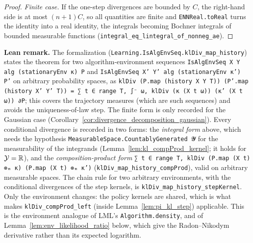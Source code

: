 \begin{proof}
\emph{Finite case.} If the one-step divergences are bounded by $C$, the right-hand side is at
most $(n+1)C$, so all quantities are finite and \texttt{ENNReal.toReal} turns the identity into
a real identity, the integrals becoming Bochner integrals of bounded measurable functions
(\texttt{integral\_eq\_lintegral\_of\_nonneg\_ae}).
\end{proof}

\textbf{Lean remark.} The formalization (\texttt{Learning.IsAlgEnvSeq.klDiv\_map\_history})
states the theorem for two algorithm-environment sequences \texttt{IsAlgEnvSeq X Y alg
(stationaryEnv κ) P} and \texttt{IsAlgEnvSeq X' Y' alg (stationaryEnv κ') P'} on arbitrary
probability spaces, as \texttt{klDiv (P.map (history X Y T)) (P'.map (history X' Y' T)) =
∑ t ∈ range T, ∫⁻ ω, klDiv (κ (X t ω)) (κ' (X t ω)) ∂P}; this covers the trajectory
measures (which are such sequences) and avoids the uniqueness-of-law step. The finite form is
only recorded for the Gaussian case (Corollary~\ref{cor:divergence_decomposition_gaussian}).
Every conditional divergence is recorded in two forms: the \emph{integral form} above, which
needs the hypothesis \texttt{MeasurableSpace.CountablyGenerated 𝓨} for the measurability of the
integrands (Lemma~\ref{lem:kl_compProd_kernel}; it holds for $\mathcal{Y} = \mathbb{R}$), and the
\emph{composition-product form} \texttt{∑ t ∈ range T, klDiv (P.map (X t) ⊗ₘ κ) (P.map
(X t) ⊗ₘ κ')} (\texttt{klDiv\_map\_history\_compProd}), valid on arbitrary measurable spaces.
The chain rule for two arbitrary environments, with the conditional divergences of the step
kernels, is \texttt{klDiv\_map\_history\_stepKernel}. Only the environment changes: the policy
kernels are shared, which is what makes \texttt{klDiv\_compProd\_left} (inside
Lemma~\ref{lem:pi_kl_step}) applicable. This is the environment analogue of LML's
\texttt{Algorithm.density}, and of Lemma~\ref{lem:env_likelihood_ratio} below, which give the
Radon--Nikodym derivative rather than its expected logarithm.

